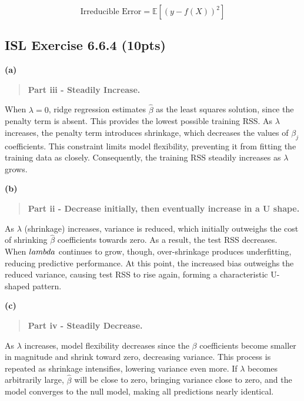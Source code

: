 \documentclass[
  letterpaper,
  DIV=11,
  numbers=noendperiod]{scrartcl}
\begin{document}
\[
\text{Irreducible Error} = \mathbb{E}[(y - f(X))^2]
\]

\subsection{ISL Exercise 6.6.4 (10pts)}\label{isl-exercise-6.6.4-10pts}

\textbf{(a)}

\begin{quote}
\textbf{Part iii - Steadily Increase.}
\end{quote}

When \(\lambda = 0\), ridge regression estimates \(\hat{\beta}\) as the
least squares solution, since the penalty term is absent. This provides
the lowest possible training RSS. As \(\lambda\) increases, the penalty
term introduces shrinkage, which decreases the values of \(\beta_j\)
coefficients. This constraint limits model flexibility, preventing it
from fitting the training data as closely. Consequently, the training
RSS steadily increases as \(\lambda\) grows.

\textbf{(b)}

\begin{quote}
\textbf{Part ii - Decrease initially, then eventually increase in a U
shape.}
\end{quote}

As \(\lambda\) (shrinkage) increases, variance is reduced, which
initially outweighs the cost of shrinking \(\hat{\beta}\) coefficients
towards zero. As a result, the test RSS decreases. When \(\\\\lambda\)
continues to grow, though, over-shrinkage produces underfitting,
reducing predictive performance. At this point, the increased bias
outweighs the reduced variance, causing test RSS to rise again, forming
a characteristic U-shaped pattern.

\textbf{(c)}

\begin{quote}
\textbf{Part iv - Steadily Decrease.}
\end{quote}

As \(\lambda\) increases, model flexibility decreases since the
\(\beta\) coefficients become smaller in magnitude and shrink toward
zero, decreasing variance. This process is repeated as shrinkage
intensifies, lowering variance even more. If \(\lambda\) becomes
arbitrarily large, \(\hat{\beta}\) will be close to zero, bringing
variance close to zero, and the model converges to the null model,
making all predictions nearly identical.
\end{document}
